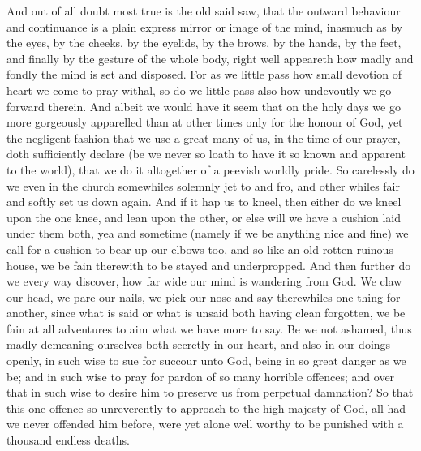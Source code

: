 \documentclass[a5paper]{scrbook}
\begin{document}
	And out of all doubt most true is the old said saw, that the outward behaviour and continuance is a plain express mirror or image of the mind, inasmuch as by the eyes, by the cheeks, by the eyelids, by the brows, by the hands, by the feet, and finally by the gesture of the whole body, right well appeareth how madly and fondly the mind is set and disposed. For as we little pass how small devotion of heart we come to pray withal, so do we little pass also how undevoutly we go forward therein. And albeit we would have it seem that on the holy days we go more gorgeously apparelled than at other times only for the honour of God, yet the negligent fashion that we use a great many of us, in the time of our prayer, doth sufficiently declare (be we never so loath to have it so known and apparent to the world), that we do it altogether of a peevish worldly pride. So carelessly do we even in the church somewhiles solemnly jet to and fro, and other whiles fair and softly set us down again. And if it hap us to kneel, then either do we kneel upon the one knee, and lean upon the other, or else will we have a cushion laid under them both, yea and sometime (namely if we be anything nice and fine) we call for a cushion to bear up our elbows too, and so like an old rotten ruinous house, we be fain therewith to be stayed and underpropped. And then further do we every way discover, how far wide our mind is wandering from God. We claw our head, we pare our nails, we pick our nose and say therewhiles one thing for another, since what is said or what is unsaid both having clean forgotten, we be fain at all adventures to aim what we have more to say. Be we not ashamed, thus madly demeaning ourselves both secretly in our heart, and also in our doings openly, in such wise to sue for succour unto God, being in so great danger as we be; and in such wise to pray for pardon of so many horrible offences; and over that in such wise to desire him to preserve us from perpetual damnation? So that this one offence so unreverently to approach to the high majesty of God, all had we never offended him before, were yet alone well worthy to be punished with a thousand endless deaths.
	
\end{document}
